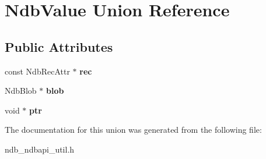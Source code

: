 \hypertarget{unionNdbValue}{}\section{Ndb\+Value Union Reference}
\label{unionNdbValue}
\subsection*{Public Attributes}
\begin{DoxyCompactItemize}
\item 
\mbox{\label{unionNdbValue_aaab3ee97bbcc5d0640fce14c3153c7b8}} 
const Ndb\+Rec\+Attr $\ast$ {\bfseries rec}
\item 
\mbox{\label{unionNdbValue_adf5ed84d74af1edb0c20b6127ec5eb09}} 
Ndb\+Blob $\ast$ {\bfseries blob}
\item 
\mbox{\label{unionNdbValue_a2512a381458841b73258bb16bcd1ff05}} 
void $\ast$ {\bfseries ptr}
\end{DoxyCompactItemize}


The documentation for this union was generated from the following file\+:\begin{DoxyCompactItemize}
\item 
ndb\+\_\+ndbapi\+\_\+util.\+h\end{DoxyCompactItemize}
